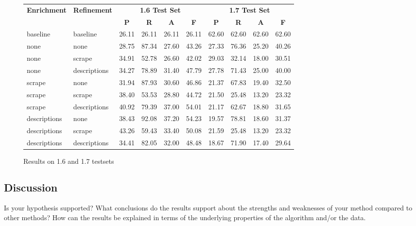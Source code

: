 \documentclass{article}
\begin{document}
\begin{center}
\begin{figure}[hbtp]
\begin{tabular}{|l|l||c|c|c|c||c|c|c|c|}
\hline
\multirow{2}{*}{{\bf Enrichment}} & \multirow{2}{*}{{\bf Refinement}} & \multicolumn{4}{c||}{{\bf 1.6 Test Set}} & \multicolumn{4}{c|}{{\bf 1.7 Test Set}}  \\
\cline{3-10}
& & {\bf P} & {\bf R} & {\bf A} & {\bf F} & {\bf P} & {\bf R} & {\bf A} & {\bf F} \\
\hline \hline
baseline & baseline & 26.11 & 26.11 & 26.11 & 26.11 & 62.60 & 62.60 & 62.60 & 62.60 \\
\hline\hline
none & none & 28.75 & 87.34 & 27.60 & 43.26 & 27.33 & 76.36 & 25.20 & 40.26  \\
\hline
none & scrape & 34.91 & 52.78 & 26.60 & 42.02  & 29.03 & 32.14 & 18.00 & 30.51\\
\hline
none & descriptions & 34.27 & 78.89 & 31.40 & 47.79 &  27.78 & 71.43 & 25.00 & 40.00\\
\hline\hline
scrape & none & 31.94 & 87.93 & 30.60 & 46.86 & 21.37 & 67.83 & 19.40 & 32.50  \\
\hline
scrape & scrape & 38.40 & 53.53 & 28.80 & 44.72 & 21.50 & 25.48 & 13.20 & 23.32 \\
\hline
scrape & descriptions & 40.92 & 79.39 & 37.00 & 54.01  & 21.17 & 62.67 & 18.80 & 31.65  \\
\hline\hline
descriptions & none & 38.43 & 92.08 & 37.20 & 54.23 & 19.57 & 78.81 & 18.60 & 31.37  \\
\hline
descriptions & scrape & 43.26 & 59.43 & 33.40 & 50.08 & 21.59 & 25.48 & 13.20 & 23.32 \\
\hline
descriptions & descriptions & 34.41 & 82.05 & 32.00 & 48.48 & 18.67 & 71.90 & 17.40 & 29.64   \\
\hline
\end{tabular}
\caption{Results on 1.6 and 1.7 testsets}
\label{fig:res1}
\end{figure}
\end{center}


\subsection{Discussion}

Is your hypothesis supported? What conclusions do the results support about the strengths and weaknesses of your method compared to other methods? How can the results be explained in terms of the underlying properties of the algorithm and/or the data. 
\end{document}
